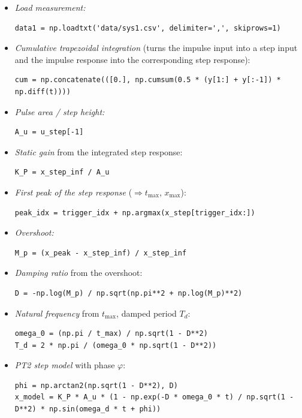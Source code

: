 \documentclass[12pt, oneside, a4paper]{scrreprt}
\begin{document}
\begin{itemize}
    \item \emph{Load measurement:}
    \begin{lstlisting}
data1 = np.loadtxt('data/sys1.csv', delimiter=',', skiprows=1)
    \end{lstlisting}

    \item \emph{Cumulative trapezoidal integration} (turns the impulse input into a step input and the impulse response into the corresponding step response):
    \begin{lstlisting}
cum = np.concatenate(([0.], np.cumsum(0.5 * (y[1:] + y[:-1]) * np.diff(t))))
    \end{lstlisting}

    \item \emph{Pulse area / step height:}
    \begin{lstlisting}
A_u = u_step[-1]
    \end{lstlisting}

    \item \emph{Static gain} from the integrated step response:
    \begin{lstlisting}
K_P = x_step_inf / A_u
    \end{lstlisting}

    \item \emph{First peak of the step response} ($\Rightarrow t_\mathrm{max}$, $x_\mathrm{max}$):
    \begin{lstlisting}
peak_idx = trigger_idx + np.argmax(x_step[trigger_idx:])
    \end{lstlisting}

    \item \emph{Overshoot:}
    \begin{lstlisting}
M_p = (x_peak - x_step_inf) / x_step_inf
    \end{lstlisting}

    \item \emph{Damping ratio} from the overshoot:
    \begin{lstlisting}
D = -np.log(M_p) / np.sqrt(np.pi**2 + np.log(M_p)**2)
    \end{lstlisting}

    \item \emph{Natural frequency} from $t_\mathrm{max}$, damped period $T_d$:
    \begin{lstlisting}
omega_0 = (np.pi / t_max) / np.sqrt(1 - D**2)
T_d = 2 * np.pi / (omega_0 * np.sqrt(1 - D**2))
    \end{lstlisting}

    \item \emph{PT2 step model} with phase $\varphi$:
    \begin{lstlisting}
phi = np.arctan2(np.sqrt(1 - D**2), D)
x_model = K_P * A_u * (1 - np.exp(-D * omega_0 * t) / np.sqrt(1 - D**2) * np.sin(omega_d * t + phi))
    \end{lstlisting}
\end{itemize}
\end{document}
